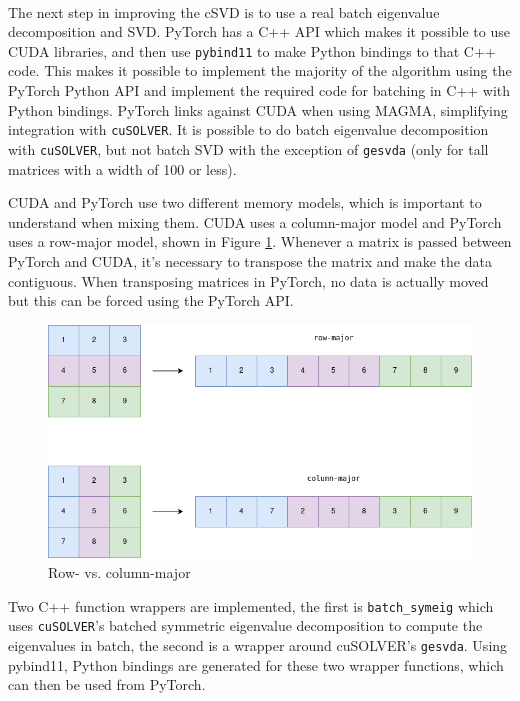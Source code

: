 $ $ \newline

The next step in improving the cSVD is to use a real batch eigenvalue decomposition and SVD. PyTorch has a C++ API which makes it possible to use CUDA libraries, and then use \texttt{pybind11} to make Python bindings to that C++ code. This makes it possible to implement the majority of the algorithm using the PyTorch Python API and implement the required code for batching in C++ with Python bindings. PyTorch links against CUDA when using MAGMA, simplifying integration with \texttt{cuSOLVER}. It is possible to do batch eigenvalue decomposition with \texttt{cuSOLVER}, but not batch SVD with the exception of \texttt{gesvda} \cite{nvidia:cusolver} (only for tall matrices with a width of 100 or less).

CUDA and PyTorch use two different memory models, which is important to understand when mixing them. CUDA uses a column-major model and PyTorch uses a row-major model, shown in Figure \ref{fig:rowcol}. Whenever a matrix is passed between PyTorch and CUDA, it's necessary to transpose the matrix and make the data contiguous. When transposing matrices in PyTorch, no data is actually moved but this can be forced using the PyTorch API.

\begin{figure}[H]
    \centering
    \includegraphics[scale=0.45]{Figures/major.png}
    \caption{Row- vs. column-major}
    \label{fig:rowcol}
\end{figure}

Two C++ function wrappers are implemented, the first is \texttt{batch\_symeig} which uses \texttt{cuSOLVER}'s batched symmetric eigenvalue decomposition to compute the eigenvalues in batch, the second is a wrapper around cuSOLVER's \texttt{gesvda}. Using pybind11, Python bindings are generated for these two wrapper functions, which can then be used from PyTorch.


